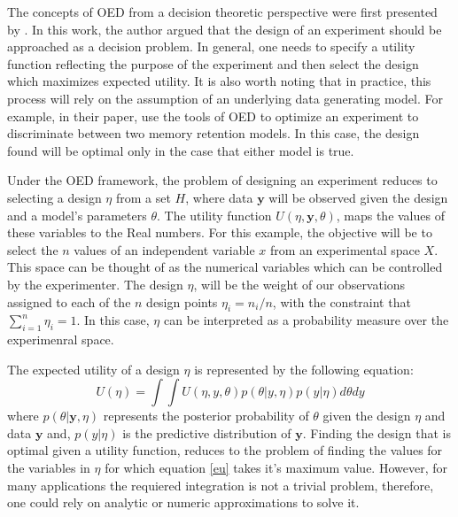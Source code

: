 \documentclass[preprint,review,12pt]{elsarticle}
\begin{document}
The concepts of OED from a decision theoretic perspective were first presented by \citet{Lindley1972}. In this work, the author argued that the design of an experiment should be approached as a decision problem. In general, one needs to specify a utility function reflecting the purpose of the experiment and then select the design which maximizes expected utility. It is also worth noting that in practice, this process will rely on the assumption of an underlying data generating model. For example, in their paper, \citet{Myung2009} use the tools of OED to optimize an experiment to discriminate between two memory retention models. In this case, the design found will be optimal only in the case that either model is true.

Under the OED framework, the problem of designing an experiment reduces to selecting a design $\eta$ from a set $H$, where data $\mathbf{y}$ will be observed given the design and a model's parameters $\theta$. The utility function $U(\eta,\mathbf{y},\theta)$, maps the values of these variables to the Real numbers. For this example, the objective will be to select the $n$ values of an independent variable $x$ from an experimental space $X$. This space can be thought of as the numerical variables which can be controlled by the experimenter. The design $\eta$, will be the weight of our observations assigned to each of the $n$ design points $\eta_i=n_i/n$, with the constraint that  $\sum_{i=1}^{n}\eta_i = 1$. In this case, $\eta$ can be interpreted as a probability measure over the experimenral space.

The expected utility of a design $\eta$ is represented by the following equation:
\begin{equation}
U(\eta)=\int \int U(\eta,y,\theta)p(\theta|y,\eta)p(y|\eta) d\theta dy
\label{eu}
\end{equation}
where $p(\theta|\mathbf{y},\eta)$ represents the posterior probability of $\theta$ given the design $\eta$ and data $\mathbf{y}$ and, $p(y|\eta)$ is the predictive distribution of $\mathbf{y}$. Finding the design that is optimal given a utility function, reduces to the problem of finding the values for the variables in $\eta$ for which equation \ref{eu} takes it's maximum value. However, for many applications the requiered integration is not a trivial problem, therefore, one could rely on analytic or numeric approximations to solve it.

\end{document}

